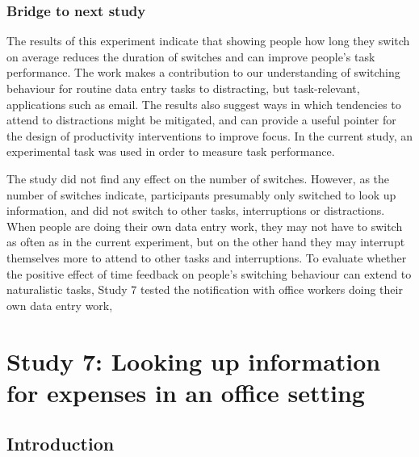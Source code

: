 \subsubsection{Bridge to next study}
The results of this experiment indicate that showing people how long they switch on average reduces the duration of switches and can improve people's task performance. The work makes a contribution to our understanding of switching behaviour for routine data entry tasks to distracting, but task-relevant, applications such as email. The results also suggest ways in which tendencies to attend to distractions might be mitigated, and can provide a useful pointer for the design of productivity interventions to improve focus. In the current study, an experimental task was used in order to measure task performance. 

The study did not find any effect on the number of switches. However, as the number of switches indicate, participants presumably only switched to look up information, and did not switch to other tasks, interruptions or distractions. When people are doing their own data entry work, they may not have to switch as often as in the current experiment, but on the other hand they may interrupt themselves more to attend to other tasks and interruptions. To evaluate whether the positive effect of time feedback on people's switching behaviour can extend to naturalistic tasks, Study 7 tested the notification with office workers doing their own data entry work,

\section{Study 7: Looking up information for expenses in an office setting}

\subsection{Introduction}


